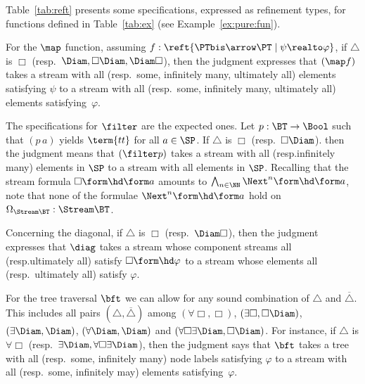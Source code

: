 
\begin{example}
\label{ex:reft:fun}
Table~\ref{tab:reft} presents some specifications,
expressed as refinement types, for functions defined in Table~\ref{tab:ex}
(see Example~\ref{ex:pure:fun}).

For the $\map$ function,
assuming $f : \reft{\PTbis \arrow \PT \mid \psi \realto \varphi}$,
if $\triangle$ is $\Box$ (resp.\ $\Diam, \Box\Diam, \Diam\Box$),
then the judgment expresses
that $(\map f)$
takes a stream with all (resp.\ some, infinitely many, ultimately all)
elements satisfying $\psi$ to a stream with all
(resp.\ some, infinitely many, ultimately all)
elements satisfying~$\varphi$.

The specifications for $\filter$ are the expected ones.
Let $p : \BT \to \Bool$ such that
$(p\, a)$ yields $\term{tt}$ for all $a \in \SP$.
If $\triangle$ is $\Box$ (resp.\ $\Box\Diam$).
then the judgment means that
$(\filter p)$ takes a stream with all (resp.\@ infinitely many) elements in $\SP$
to a stream with all elements in $\SP$.
Recalling that the stream formula $\Box \form\hd \form a$ amounts to
$\bigwedge_{n \in \NN} \Next^n \form\hd \form a$,
note that none of the formulae $\Next^n \form\hd \form a$ hold on
$\Omega_{\Stream\BT} : \Stream\BT$.

Concerning the diagonal,
if $\triangle$ is $\Box$ (resp.\ $\Diam\Box$),
then
the judgment
expresses that $\diag$ takes a stream whose component streams
all (resp.\@ ultimately all) satisfy $\Box \form\hd \varphi$
to a stream whose elements all (resp.\ ultimately all)
satisfy $\varphi$.

For the tree traversal $\bft$ we can allow for any sound
combination of $\triangle$ and $\overline\triangle$.
This includes all pairs $(\triangle,\overline\triangle)$
among
$(\forall \Box, \Box)$,
$(\exists \Box, \Box\Diam)$,
$(\exists \Diam, \Diam)$,
$(\forall \Diam, \Diam)$
and
$(\forall \Box \exists \Diam, \Box\Diam)$.
For instance,
if $\triangle$ is $\forall\Box$
(resp.\ $\exists\Diam, \forall\Box\exists\Diam$),
then
the judgment says that $\bft$
takes a tree with all (resp.\ some, infinitely many) node
labels satisfying $\varphi$ to a stream with all (resp.\ some, infinitely may)
elements satisfying~$\varphi$.
\end{example}

